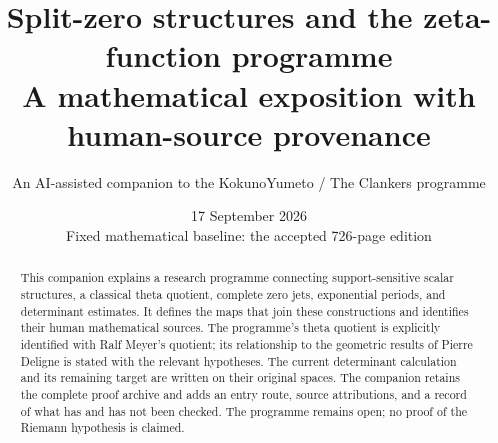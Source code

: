 \documentclass[11pt,a4paper]{article}
\title{Split-zero structures and the zeta-function programme\\[.5em]\large A mathematical exposition with human-source provenance}
\author{An AI-assisted companion to the KokunoYumeto / The Clankers programme}
\date{17 September 2026\\\small Fixed mathematical baseline: the accepted 726-page edition}
\theoremstyle{definition}
\theoremstyle{remark}
\begin{document}
\maketitle
\begin{abstract}
This companion explains a research programme connecting support-sensitive scalar structures, a classical theta quotient, complete zero jets, exponential periods, and determinant estimates. It defines the maps that join these constructions and identifies their human mathematical sources. The programme's theta quotient is explicitly identified with Ralf Meyer's quotient; its relationship to the geometric results of Pierre Deligne is stated with the relevant hypotheses. The current determinant calculation and its remaining target are written on their original spaces. The companion retains the complete proof archive and adds an entry route, source attributions, and a record of what has and has not been checked. The programme remains open; no proof of the Riemann hypothesis is claimed.
\end{abstract}
\clearpage

\clearpage
{\small\setlength{\parskip}{0pt}\tableofcontents}
\clearpage

\appendix


\clearpage


\end{document}
